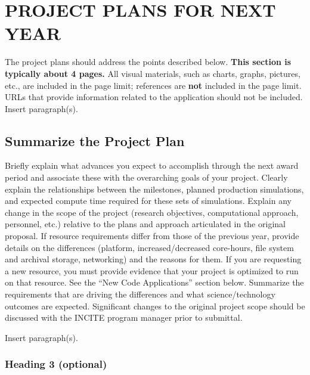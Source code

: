 \documentclass[11pt,letterpaper,english]{article}
\begin{document}
\setlength{\parindent}{0in}%


\pagestyle{fancy}   \renewcommand{%
\headrulewidth}{0.0pt}




\section{PROJECT PLANS FOR NEXT YEAR} 

The project plans should address the points described below. {\bf This section is typically about 4 pages.} All visual materials, such as charts, graphs, pictures, etc., are included in the page limit; references are {\bf not} included in the page limit.  URLs that provide information related to the application should not be included. \\

Insert paragraph(s).

\subsection{Summarize the Project Plan} 

Briefly explain what advances you expect to accomplish through the next award period and associate these with the overarching goals of your project. Clearly explain the relationships between the milestones, planned production simulations, and expected compute time required for these sets of simulations. Explain any change in the scope of the project (research objectives, computational approach, personnel, etc.) relative to the plans and approach articulated in the original proposal. If resource requirements differ from those of the previous year, provide details on the differences (platform, increased/decreased core-hours, file system and archival storage, networking) and the reasons for them. If you are requesting a new resource, you must provide evidence that your project is optimized to run on that resource. See the ``New Code Applications'' section below. Summarize the requirements that are driving the differences and what science/technology outcomes are expected. Significant changes to the original project scope should be discussed with the INCITE program manager prior to submittal.

Insert paragraph(s).

\subsubsection{Heading 3 (optional)}
\end{document}
